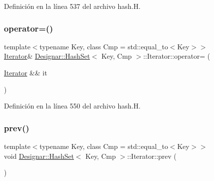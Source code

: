 Definición en la línea 537 del archivo hash.\+H.

\mbox{\label{class_designar_1_1_hash_set_1_1_iterator_a5856c1a7f46a0c4e2899acff687fdf13}} 
\subsubsection{\texorpdfstring{operator=()}{operator=()}\hspace{0.1cm}{\footnotesize\ttfamily [2/2]}}
{\footnotesize\ttfamily template$<$typename Key, class Cmp = std\+::equal\+\_\+to$<$\+Key$>$$>$ \\
\hyperlink{class_designar_1_1_hash_set_1_1_iterator}{Iterator}\& \hyperlink{class_designar_1_1_hash_set}{Designar\+::\+Hash\+Set}$<$ Key, Cmp $>$\+::Iterator\+::operator= (\begin{DoxyParamCaption}\item[{\hyperlink{class_designar_1_1_hash_set_1_1_iterator}{Iterator} \&\&}]{it }\end{DoxyParamCaption})\hspace{0.3cm}{\ttfamily [inline]}}



Definición en la línea 550 del archivo hash.\+H.

\mbox{\label{class_designar_1_1_hash_set_1_1_iterator_a678b8d6f21627b05cbde7d11da64a010}} 
\subsubsection{\texorpdfstring{prev()}{prev()}}
{\footnotesize\ttfamily template$<$typename Key, class Cmp = std\+::equal\+\_\+to$<$\+Key$>$$>$ \\
void \hyperlink{class_designar_1_1_hash_set}{Designar\+::\+Hash\+Set}$<$ Key, Cmp $>$\+::Iterator\+::prev (\begin{DoxyParamCaption}{ }\end{DoxyParamCaption})\hspace{0.3cm}{\ttfamily [inline]}}



